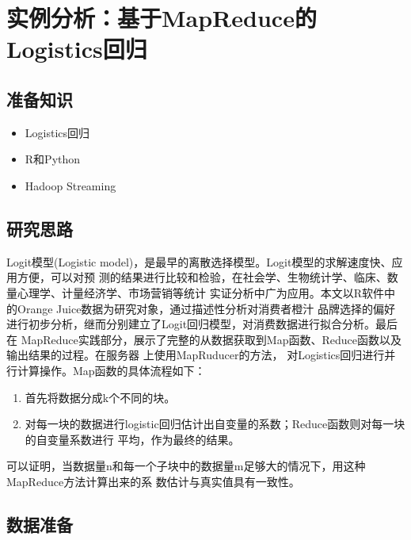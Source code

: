 \section{实例分析：基于MapReduce的Logistics回归}\label{ux5b9eux4f8bux5206ux6790ux57faux4e8emapreduceux7684logisticsux56deux5f52}

\subsection{准备知识}\label{ux51c6ux5907ux77e5ux8bc6}

\begin{itemize}
\itemsep1pt\parskip0pt
\item
  Logistics回归
\item
  R和Python
\item
  Hadoop Streaming
\end{itemize}

\subsection{研究思路}\label{ux7814ux7a76ux601dux8def}

Logit模型(Logistic
model)，是最早的离散选择模型。Logit模型的求解速度快、应用方便，可以对预
测的结果进行比较和检验，在社会学、生物统计学、临床、数量心理学、计量经济学、市场营销等统计
实证分析中广为应用。本文以R软件中的Orange
Juice数据为研究对象，通过描述性分析对消费者橙汁
品牌选择的偏好进行初步分析，继而分别建立了Logit回归模型，对消费数据进行拟合分析。最后在
MapReduce实践部分，展示了完整的从数据获取到Map函数、Reduce函数以及输出结果的过程。在服务器
上使用MapRuducer的方法，
对Logistics回归进行并行计算操作。Map函数的具体流程如下：

\begin{enumerate}
\def\labelenumi{\arabic{enumi}.}
\item
  首先将数据分成k个不同的块。
\item
  对每一块的数据进行logistic回归估计出自变量的系数；Reduce函数则对每一块的自变量系数进行
  平均，作为最终的结果。
\end{enumerate}

可以证明，当数据量n和每一个子块中的数据量m足够大的情况下，用这种MapReduce方法计算出来的系
数估计与真实值具有一致性。

\subsection{数据准备}\label{ux6570ux636eux51c6ux5907}

